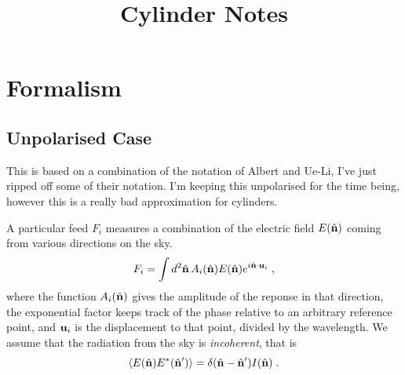 \documentclass[onecolumn]{revtex4}
\begin{document}
\title{Cylinder Notes}

\maketitle



\section{Formalism}

\subsection{Unpolarised Case}

This is based on a combination of the notation of Albert and Ue-Li, I've just
ripped off some of their notation. I'm keeping this unpolarised for the time
being, however this is a really bad approximation for cylinders.

A particular feed $F_i$ measures a combination of the electric field $E(\hat{\mathbf{n}})$
coming from various directions on the sky.
\begin{equation}
F_i = \int d^2\hat{\mathbf{n}} \, A_i(\hat{\mathbf{n}}) E(\hat{\mathbf{n}}) e^{i \hat{\mathbf{n}}\cdot\mathbf{u}_i}\; ,
\end{equation}
where the function $A_i(\hat{\mathbf{n}})$ gives the amplitude of the reponse in that
direction, the exponential factor keeps track of the phase relative to an
arbitrary reference point, and $\mathbf{u}_i$ is the displacement to that point,
divided by the wavelength. We assume that the radiation from the sky is
\emph{incoherent}, that is
\begin{equation}
\left\langle E(\hat{\mathbf{n}}) E^* (\hat{\mathbf{n}}') \right\rangle = \delta(\hat{\mathbf{n}} - \hat{\mathbf{n}}') I(\hat{\mathbf{n}}) \; .
\end{equation}
\end{document}
